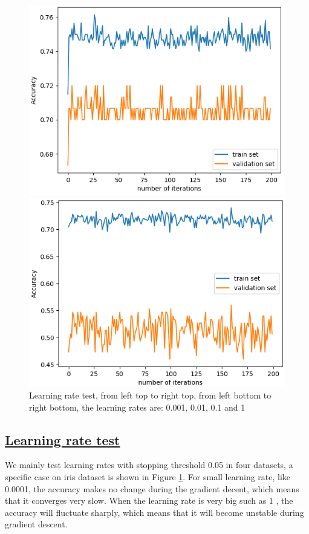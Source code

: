 \documentclass[11pt]{scrartcl}
\begin{document}
\begin{figure}[H]
\begin{minipage}{0.8\linewidth}
\begin{minipage}[b]{0.48\linewidth}
			\includegraphics[width= \linewidth]{fig/iris-lr-01.png}
		  \end{minipage}
		  \hfill
		  \begin{minipage}[b]{0.48\linewidth}
			\centering			
			\includegraphics[width= \linewidth]{fig/iris-lr-1.png}
		  \end{minipage}
	\end{minipage}
	\caption{Learning rate test, from left top to right top, from left bottom to right bottom, the learning rates are: 0.001, 0.01, 0.1 and 1}
	\label{lr_test}
\end{figure}

\subsection*{\underline{Learning rate test}}
We mainly test learning rates with stopping threshold 0.05 in four datasets, a specific case on iris dataset is shown in Figure \ref{lr_test}. For small learning rate, like 0.0001, the accuracy makes no change during the gradient decent, which means that it converges very slow. When the learning rate is very big such as 1 , the accuracy will fluctuate sharply, which means that it will become unstable during gradient descent. 
\end{document}
